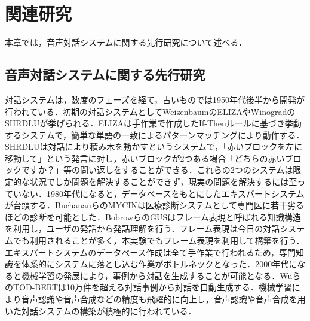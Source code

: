 \section{関連研究}
\label{関連研究}
本章では，音声対話システムに関する先行研究について述べる．

\subsection{音声対話システムに関する先行研究}
\label{音声対話システムに関する先行研究}

対話システムは，数度のフェーズを経て，古いものでは1950年代後半から開発が行われている．\cite{higashinaka2020python}初期の対話システムとしてWeizenbaumのELIZA\cite{weizenbaum1966eliza}やWinogradのSHRDLU\cite{winograd1971shrdlu}が挙げられる．ELIZAは手作業で作成したIf-Thenルールに基づき挙動するシステムで，簡単な単語の一致によるパターンマッチングにより動作する．SHRDLUは対話により積み木を動かすというシステムで，「赤いブロックを左に移動して」という発言に対し，赤いブロックが2つある場合「どちらの赤いブロックですか？」等の問い返しをすることができる．これらの2つのシステムは限定的な状況でしか問題を解決することができず，現実の問題を解決するには至っていない．1980年代になると，データベースをもとにしたエキスパートシステムが台頭する．BuchananらのMYCIN\cite{buchanan1984rule}は医療診断システムとして専門医に若干劣るほどの診断を可能とした．BobrowらのGUS\cite{bobrow1977gus}はフレーム表現と呼ばれる知識構造を利用し，ユーザの発話から発話理解を行う．フレーム表現は今日の対話システムでも利用されることが多く，本実験でもフレーム表現を利用して構築を行う．エキスパートシステムのデータベース作成は全て手作業で行われるため，専門知識を体系的にシステムに落とし込む作業がボトルネックとなった．2000年代になると機械学習の発展により，事例から対話を生成することが可能となる．WuらのTOD-BERT\cite{wu2020tod}は10万件を超える対話事例から対話を自動生成する．機械学習により音声認識や音声合成などの精度も飛躍的に向上し，音声認識や音声合成を用いた対話システムの構築が積極的に行われている．\cite{higsshinakalive}

